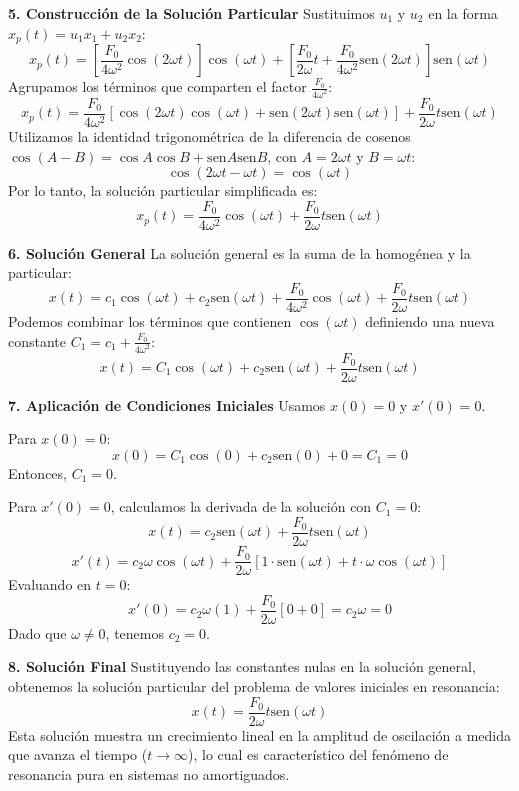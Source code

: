 \documentclass[a4paper]{article}
\begin{document}
\textbf{5. Construcción de la Solución Particular}
Sustituimos $u_1$ y $u_2$ en la forma $x_p(t) = u_1 x_1 + u_2 x_2$:
$$
x_p(t) = \left[ \frac{F_0}{4\omega^2} \cos(2\omega t) \right] \cos(\omega t) + \left[ \frac{F_0}{2\omega} t + \frac{F_0}{4\omega^2} \text{sen}(2\omega t) \right] \text{sen}(\omega t)
$$
Agrupamos los términos que comparten el factor $\frac{F_0}{4\omega^2}$:
$$
x_p(t) = \frac{F_0}{4\omega^2} [ \cos(2\omega t) \cos(\omega t) + \text{sen}(2\omega t) \text{sen}(\omega t) ] + \frac{F_0}{2\omega} t \text{sen}(\omega t)
$$
Utilizamos la identidad trigonométrica de la diferencia de cosenos $\cos(A - B) = \cos A \cos B + \text{sen} A \text{sen} B$, con $A = 2\omega t$ y $B = \omega t$:
$$
\cos(2\omega t - \omega t) = \cos(\omega t)
$$
Por lo tanto, la solución particular simplificada es:
$$
x_p(t) = \frac{F_0}{4\omega^2} \cos(\omega t) + \frac{F_0}{2\omega} t \text{sen}(\omega t)
$$

\textbf{6. Solución General}
La solución general es la suma de la homogénea y la particular:
$$
x(t) = c_1 \cos(\omega t) + c_2 \text{sen}(\omega t) + \frac{F_0}{4\omega^2} \cos(\omega t) + \frac{F_0}{2\omega} t \text{sen}(\omega t)
$$
Podemos combinar los términos que contienen $\cos(\omega t)$ definiendo una nueva constante $C_1 = c_1 + \frac{F_0}{4\omega^2}$:
$$
x(t) = C_1 \cos(\omega t) + c_2 \text{sen}(\omega t) + \frac{F_0}{2\omega} t \text{sen}(\omega t)
$$

\textbf{7. Aplicación de Condiciones Iniciales}
Usamos $x(0)= 0$ y $x'(0)= 0$.

Para $x(0) = 0$:
$$
x(0) = C_1 \cos(0) + c_2 \text{sen}(0) + 0 = C_1 = 0
$$
Entonces, $C_1 = 0$.

Para $x'(0) = 0$, calculamos la derivada de la solución con $C_1 = 0$:
$$
x(t) = c_2 \text{sen}(\omega t) + \frac{F_0}{2\omega} t \text{sen}(\omega t)
$$
$$
x'(t) = c_2 \omega \cos(\omega t) + \frac{F_0}{2\omega} [ 1 \cdot \text{sen}(\omega t) + t \cdot \omega \cos(\omega t) ]
$$
Evaluando en $t = 0$:
$$
x'(0) = c_2 \omega (1) + \frac{F_0}{2\omega} [ 0 + 0 ] = c_2 \omega = 0
$$
Dado que $\omega \neq 0$, tenemos $c_2 = 0$.

\textbf{8. Solución Final}
Sustituyendo las constantes nulas en la solución general, obtenemos la solución particular del problema de valores iniciales en resonancia:
$$
x(t) = \frac{F_0}{2\omega} t \text{sen}(\omega t)
$$
Esta solución muestra un crecimiento lineal en la amplitud de oscilación a medida que avanza el tiempo ($t \to \infty$), lo cual es característico del fenómeno de resonancia pura en sistemas no amortiguados.
\end{document}
